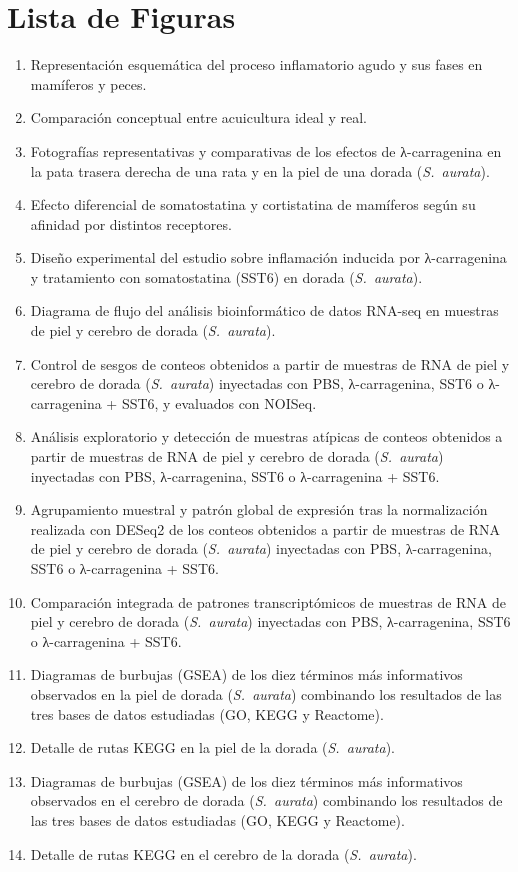 \documentclass[10pt,a4paper]{article}
\begin{document}
\section*{Lista de Figuras}
\begin{enumerate}[label=\textbf{Figura \arabic*.}, leftmargin=*, align=left]
  \item Representación esquemática del proceso inflamatorio agudo y sus fases en mamíferos y peces.
  \item Comparación conceptual entre acuicultura ideal y real.
  \item Fotografías representativas y comparativas de los efectos de λ-carragenina en la pata trasera derecha de una rata y en la piel de una dorada (\textit{S.\ aurata}).
  \item Efecto diferencial de somatostatina y cortistatina de mamíferos según su afinidad por distintos receptores.
  \item Diseño experimental del estudio sobre inflamación inducida por λ-carragenina y tratamiento con somatostatina (SST6) en dorada (\textit{S.\ aurata}).
  \item Diagrama de flujo del análisis bioinformático de datos RNA-seq en muestras de piel y cerebro de dorada (\textit{S.\ aurata}).
  \item Control de sesgos de conteos obtenidos a partir de muestras de RNA de piel y cerebro de dorada (\textit{S.\ aurata}) inyectadas con PBS, λ-carragenina, SST6 o λ-carragenina + SST6, y evaluados con NOISeq.
  \item Análisis exploratorio y detección de muestras atípicas de conteos obtenidos a partir de muestras de RNA de piel y cerebro de dorada (\textit{S.\ aurata}) inyectadas con PBS, λ-carragenina, SST6 o λ-carragenina + SST6.
  \item Agrupamiento muestral y patrón global de expresión tras la normalización realizada con DESeq2 de los conteos obtenidos a partir de muestras de RNA de piel y cerebro de dorada (\textit{S.\ aurata}) inyectadas con PBS, λ-carragenina, SST6 o λ-carragenina + SST6.
  \item Comparación integrada de patrones transcriptómicos de muestras de RNA de piel y cerebro de dorada (\textit{S.\ aurata}) inyectadas con PBS, λ-carragenina, SST6 o λ-carragenina + SST6. 
  \item Diagramas de burbujas (GSEA) de los diez términos más informativos observados en la piel de dorada (\textit{S.\ aurata}) combinando los resultados de las tres bases de datos estudiadas (GO, KEGG y Reactome). 
  \item Detalle de rutas KEGG en la piel de la dorada (\textit{S.\ aurata}).
  \item Diagramas de burbujas (GSEA) de los diez términos más informativos observados en el cerebro de dorada (\textit{S.\ aurata}) combinando los resultados de las tres bases de datos estudiadas (GO, KEGG y Reactome).
  \item Detalle de rutas KEGG en el cerebro de la dorada (\textit{S.\ aurata}).
\end{enumerate}
\end{document}

